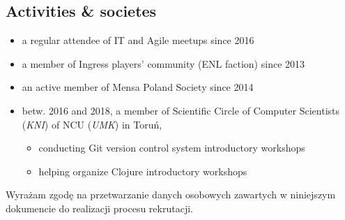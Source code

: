 \documentclass[a4paper]{res}
\begin{document}
\begin{resume}
    \section{Activities \& societes}
        \vspace{0.14in}
    \begin{itemize}
        \item a regular attendee of IT and Agile meetups since 2016
        \vspace{-0.03in}
        \item a member of Ingress players' community (ENL faction) since 2013
        \vspace{-0.03in}
        \item an active member of Mensa Poland Society since 2014
        \vspace{-0.01in}
        \item \footnotesize betw. 2016 and 2018, a member of {Scientific Circle of Computer Scientists (\textsl{KNI})
        of NCU (\textsl{UMK}) in Toruń},
        \vspace{-0.04in}
        \begin{itemize}
        \vspace{-0.01in}
            \item conducting Git version control system introductory workshops
        \vspace{-0.03in}
            \item helping organize Clojure introductory workshops
        \end{itemize}
    \end{itemize}
\end{resume}
\vspace{-0.29in}
\begin{center}
    \noindent\makebox[\dimexpr\linewidth]{\rule{\dimexpr\paperwidth-4.5in}{0.4pt}}
    \footnotesize
Wyrażam zgodę na przetwarzanie danych osobowych zawartych \linebreak w niniejszym dokumencie do realizacji procesu rekrutacji.
\end{center}
\end{document}
